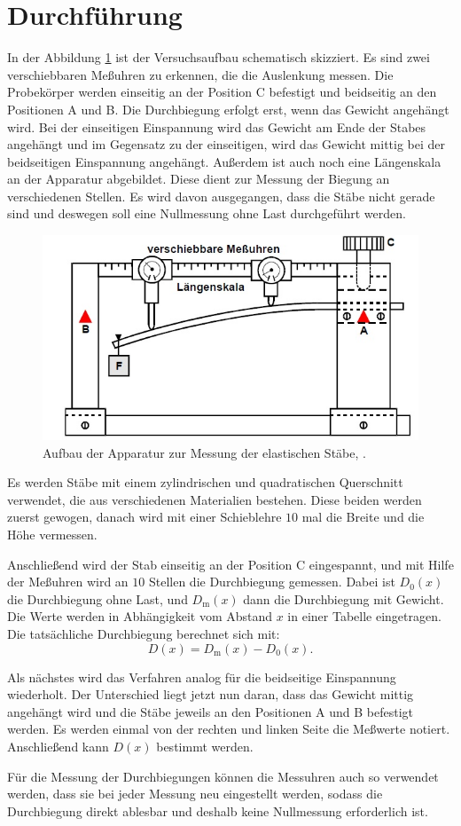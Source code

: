 \section{Durchführung}
\label{sec:Durchführung}
In der Abbildung \ref{fig:aufbau} ist der Versuchsaufbau schematisch skizziert. Es sind zwei verschiebbaren Meßuhren zu erkennen, die die Auslenkung messen. Die Probekörper werden einseitig an der Position C 
befestigt und beidseitig an den Positionen A und B. Die Durchbiegung erfolgt erst, wenn das Gewicht angehängt wird. Bei der einseitigen Einspannung wird das Gewicht am Ende der Stabes angehängt und im Gegensatz 
zu der einseitigen, wird das Gewicht mittig bei der beidseitigen Einspannung angehängt.
Außerdem ist auch noch eine Längenskala an der Apparatur abgebildet. Diese dient zur Messung der Biegung an verschiedenen Stellen. 
Es wird davon ausgegangen, dass die Stäbe nicht gerade sind und deswegen soll eine Nullmessung ohne Last durchgeführt werden. 
\begin{figure}[h!]
	\centering
	\includegraphics[width=0.7\linewidth]{Aufbau.jpg}
	\caption{Aufbau der Apparatur zur Messung der elastischen Stäbe, \cite[6]{anleitung103}.}
	\label{fig:aufbau}
\end{figure}
Es werden Stäbe mit einem zylindrischen und quadratischen Querschnitt verwendet, die aus verschiedenen Materialien bestehen. Diese beiden werden zuerst gewogen, danach wird mit einer 
Schieblehre $10$ mal die Breite und die Höhe vermessen. 

Anschließend wird der Stab einseitig an der Position C eingespannt, und mit Hilfe der Meßuhren wird an $10$ Stellen die Durchbiegung gemessen.
Dabei ist $D_{0}(x)$ die Durchbiegung ohne Last, und $D_{\text{m}}(x)$ dann die Durchbiegung mit Gewicht. Die Werte werden in Abhängigkeit vom Abstand $x$ in einer Tabelle eingetragen. 
Die tatsächliche Durchbiegung berechnet sich mit:
\begin{equation*}
\label{eqn:Durchbiegung}
D(x) = D_{\text{m}}(x) - D_{0}(x).
\end{equation*}

Als nächstes wird das Verfahren analog für die beidseitige Einspannung wiederholt. Der Unterschied liegt jetzt nun daran, dass das Gewicht mittig angehängt wird und die Stäbe jeweils an den Positionen A  und B 
 befestigt werden. Es werden einmal von der rechten und linken Seite die Meßwerte notiert. Anschließend kann $D(x)$ bestimmt werden. 

Für die Messung der Durchbiegungen können die Messuhren auch so verwendet werden, dass sie bei jeder Messung neu eingestellt werden, sodass die Durchbiegung direkt ablesbar und deshalb keine Nullmessung erforderlich ist.